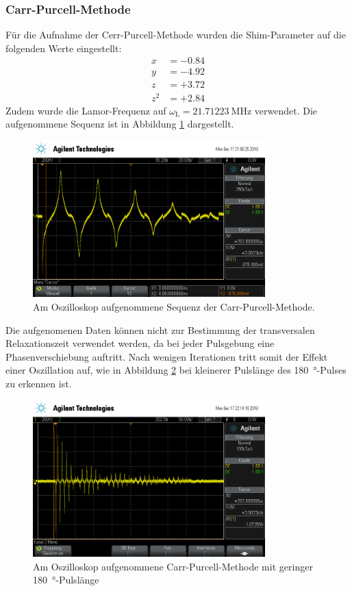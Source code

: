 \subsubsection{Carr-Purcell-Methode}
Für die Aufnahme der Cerr-Purcell-Methode wurden die Shim-Parameter auf die
folgenden Werte eingestellt:
\begin{align*}
  x &= -\num{0.84} \\
  y &= -\num{4.92} \\
  z &= +\num{3.72} \\
  z^2 &= +\num{2.84}
\end{align*}
Zudem wurde die Lamor-Frequenz auf $\omega_\text{L} = \SI{21.71223}{\mega\hertz}$
verwendet. Die aufgenommene Sequenz ist in Abbildung \ref{fig:CP} dargestellt.
\begin{figure}[htb]
  \centering
  \includegraphics[width=0.8\textwidth]{rohdaten/cp_2.png}
  \caption{Am Oszilloskop aufgenommene Sequenz der Carr-Purcell-Methode.}
  \label{fig:CP}
\end{figure}
Die aufgenomenen Daten können nicht zur Bestimmung der transversalen
Relaxationszeit verwendet werden, da bei jeder Pulsgebung eine Phasenverschiebung
auftritt. Nach wenigen Iterationen tritt somit der Effekt einer Oszillation auf,
wie in Abbildung \ref{fig:CP2} bei kleinerer Pulslänge des \SI{180}{\degree}-Pulses
zu erkennen ist.
\begin{figure}[htb]
  \centering
  \includegraphics[width=0.8\textwidth]{rohdaten/cp_3.png}
  \caption{Am Oszilloskop aufgenommene Carr-Purcell-Methode mit geringer
  \SI{180}{\degree}-Pulslänge}
  \label{fig:CP2}
\end{figure}
\FloatBarrier


